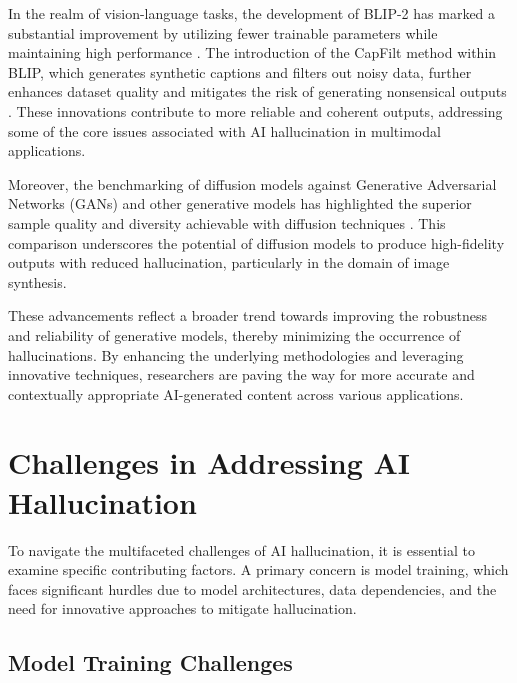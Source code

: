 In the realm of vision-language tasks, the development of BLIP-2 has marked a substantial improvement by utilizing fewer trainable parameters while maintaining high performance \cite{li2023blip}. The introduction of the CapFilt method within BLIP, which generates synthetic captions and filters out noisy data, further enhances dataset quality and mitigates the risk of generating nonsensical outputs \cite{BLIP:Boots6}. These innovations contribute to more reliable and coherent outputs, addressing some of the core issues associated with AI hallucination in multimodal applications.



Moreover, the benchmarking of diffusion models against Generative Adversarial Networks (GANs) and other generative models has highlighted the superior sample quality and diversity achievable with diffusion techniques \cite{dhariwal2021diffusion}. This comparison underscores the potential of diffusion models to produce high-fidelity outputs with reduced hallucination, particularly in the domain of image synthesis.



These advancements reflect a broader trend towards improving the robustness and reliability of generative models, thereby minimizing the occurrence of hallucinations. By enhancing the underlying methodologies and leveraging innovative techniques, researchers are paving the way for more accurate and contextually appropriate AI-generated content across various applications.













\section{Challenges in Addressing AI Hallucination} \label{sec:Challenges in Addressing AI Hallucination}

To navigate the multifaceted challenges of AI hallucination, it is essential to examine specific contributing factors. A primary concern is model training, which faces significant hurdles due to model architectures, data dependencies, and the need for innovative approaches to mitigate hallucination.


\subsection{Model Training Challenges} \label{subsec:Model Training Challenges}

